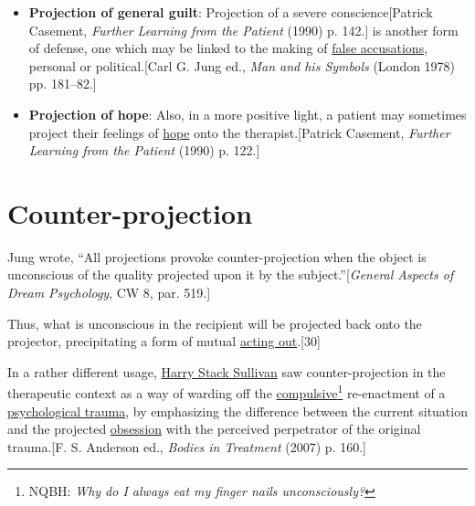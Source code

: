 \documentclass{book}
\numberwithin{equation}{section}
\begin{document}
\begin{itemize}
    Such aggressive projections of displaced negative emotions can occur anywhere from the micro-level of \href{https://en.wikipedia.org/wiki/Interpersonal_relationships}{interpersonal relationships}, all the way up through to the macro-level of international politics, or even international armed conflict.[Carl G. Jung ed., \textit{Man and his Symbols} (London 1978) pp. 181--82.]
    \item \textbf{Projection of general guilt}: Projection of a severe conscience[Patrick Casement, \textit{Further Learning from the Patient} (1990) p. 142.] is another form of defense, one which may be linked to the making of \href{https://en.wikipedia.org/wiki/False_accusations}{false accusations}, personal or political.[Carl G. Jung ed., \textit{Man and his Symbols} (London 1978) pp. 181--82.]
    \item \textbf{Projection of hope}: Also, in a more positive light, a patient may sometimes project their feelings of \href{https://en.wikipedia.org/wiki/Hope}{hope} onto the therapist.[Patrick Casement, \textit{Further Learning from the Patient} (1990) p. 122.]
\end{itemize}

\section{Counter-projection}
Jung wrote, ``All projections provoke counter-projection when the object is unconscious of the quality projected upon it by the subject.''[\textit{General Aspects of Dream Psychology}, CW 8, par. 519.]

Thus, what is unconscious in the recipient will be projected back onto the projector, precipitating a form of mutual \href{https://en.wikipedia.org/wiki/Acting_out}{acting out}.[30]

%
In a rather different usage, \href{https://en.wikipedia.org/wiki/Harry_Stack_Sullivan}{Harry Stack Sullivan} saw counter-projection in the therapeutic context as a way of warding off the \href{https://en.wikipedia.org/wiki/Compulsive_behavior}{compulsive}\footnote{NQBH: \textit{Why do I always eat my finger nails unconsciously?}} re-enactment of a \href{https://en.wikipedia.org/wiki/Psychological_trauma}{psychological trauma}, by emphasizing the difference between the current situation and the projected \href{https://en.wikipedia.org/wiki/Fixation_(psychology)}{obsession} with the perceived perpetrator of the original trauma.[F. S. Anderson ed., \textit{Bodies in Treatment} (2007) p. 160.]
\end{document}
